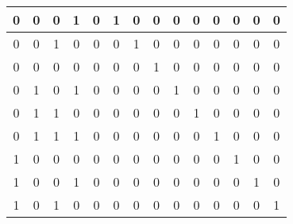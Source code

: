 \documentclass[dvipdfmx]{jsarticle}
\begin{document}
\begin{enumerate}
\begin{itemize}
\begin{table}[H]
\begin{tabular}{|c|c|c|c|c|c|c|c|c|c|c|c|c|c|}
										    0 &     0 &     0 &     1 & 0 & 1 & 0 & 0 & 0 & 0 & 0 & 0 & 0 & 0 \\ \hline
										    0 &     0 &     1 &     0 & 0 & 0 & 1 & 0 & 0 & 0 & 0 & 0 & 0 & 0 \\ \hline
										    0 &     0 &     0 &     0 & 0 & 0 & 0 & 1 & 0 & 0 & 0 & 0 & 0 & 0 \\ \hline
										    0 &     1 &     0 &     1 & 0 & 0 & 0 & 0 & 1 & 0 & 0 & 0 & 0 & 0 \\ \hline
										    0 &     1 &     1 &     0 & 0 & 0 & 0 & 0 & 0 & 1 & 0 & 0 & 0 & 0 \\ \hline
										    0 &     1 &     1 &     1 & 0 & 0 & 0 & 0 & 0 & 0 & 1 & 0 & 0 & 0 \\ \hline
										    1 &     0 &     0 &     0 & 0 & 0 & 0 & 0 & 0 & 0 & 0 & 1 & 0 & 0 \\ \hline
										    1 &     0 &     0 &     1 & 0 & 0 & 0 & 0 & 0 & 0 & 0 & 0 & 1 & 0 \\ \hline
										    1 &     0 &     1 &     0 & 0 & 0 & 0 & 0 & 0 & 0 & 0 & 0 & 0 & 1 \\ \hline
									\end{tabular}
								\end{table}
						\end{itemize}
					\end{enumerate}
\end{document}
